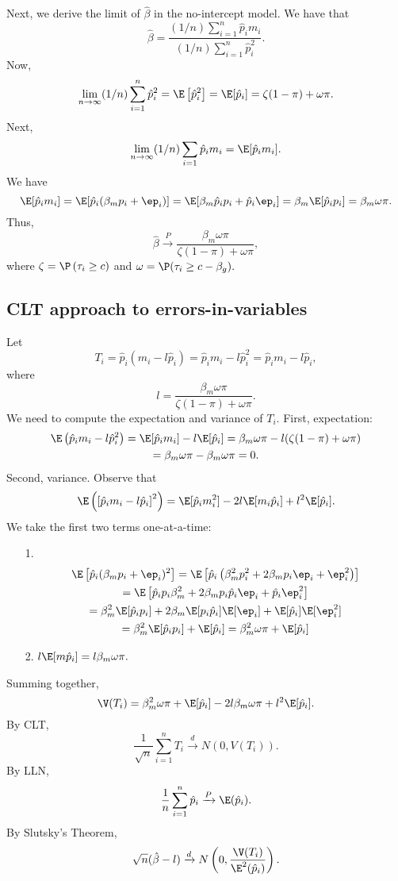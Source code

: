 \documentclass[12pt]{article}
\begin{document}
Next, we derive the limit of $\hat{\beta}$ in the no-intercept model. We have that 
$$\hat{\beta} = \frac{ (1/n) \sum_{i=1}^n \hat{p}_i m_i}{(1/n) \sum_{i=1}^n \hat{p}_i^2}.$$
Now,
$$\lim_{n \to \infty} (1/n) \sum_{i=1}^n \hat{p}_i^2 = \E\left[\hat{p}_i^2\right] = \E [\hat{p}_i] = \zeta (1 - \pi) + \omega \pi.$$
Next,
$$\lim_{n \to \infty} (1/n) \sum_{i=1} \hat{p}_i m_i = \E[\hat{p}_i m_i].$$ We have
$$ \E[\hat{p}_i m_i] = \E[ \hat{p}_i (\beta_m p_i + \ep_i)] = \E[\beta_m \hat{p}_i p_i + \hat{p}_i \ep_i] = \beta_m \E[ \hat{p}_i p_i] = \beta_m \omega \pi.$$ Thus,
$$ \hat{\beta} \xrightarrow{P} \frac{\beta_m \omega \pi}{ \zeta(1-\pi) + \omega \pi},$$ where $\zeta = \P\left(\tau_i \geq c \right)$ and $\omega = \P(\tau_i \geq c - \beta_g).$

\subsection{CLT approach to errors-in-variables}
Let 
$$ T_i = \hat{p}_i (m_i - l \hat{p}_i) = \hat{p}_im_i - l \hat{p}^2_i = \hat{p}_i m_i - l \hat{p}_i,$$ where
$$l = \frac{\beta_m \omega \pi}{\zeta (1 - \pi) + \omega \pi}. $$
We need to compute the expectation and variance of $T_i$. First, expectation:
\begin{multline*}
\E\left( \hat{p}_i m_i - l \hat{p}_i^2 \right) = \E [ \hat{p}_i m_i ] - l \E [\hat{p}_i] = \beta_m \omega \pi - l ( \zeta (1 - \pi) + \omega \pi ) \\ = \beta_m \omega \pi - \beta_m \omega \pi = 0.
\end{multline*}
Second, variance. Observe that
$$ \E \left( \left[ \hat{p}_i m_i - l \hat{p}_i \right]^2 \right) = \E [\hat{p}_i m_i^2] - 2 l \E[m_i \hat{p}_i] + l^2 \E[\hat{p}_i].$$ We take the first two terms one-at-a-time:
\begin{itemize}
\item[1.] \begin{multline*}
\E \left[ \hat{p}_i( \beta_m p_i + \ep_i )^2 \right] = \E\left[ \hat{p}_i \left( \beta_m^2 p_i^2 + 2 \beta_m p_i \ep_i + \ep_i^2 \right)  \right] \\ = \E\left[ \hat{p}_i p_i \beta^2_m + 2 \beta_m p_i \hat{p}_i \ep_i + \hat{p}_i \ep_i^2 \right] \\ = \beta^2_m \E[ \hat{p}_i p_i] + 2 \beta_m \E[p_i\hat{p}_i] \E[\ep_i] + \E[\hat{p}_i] \E[ \ep^2_i ] \\ = \beta^2_m \E[ \hat{p}_i p_i] + \E[\hat{p}_i] = \beta^2_m \omega \pi + \E[ \hat{p}_i ] 
\end{multline*}
\item[2.] $l \E[m \hat{p}_i] = l \beta_m \omega \pi.$
\end{itemize}
Summing together,
$$\V(T_i) = \beta^2_m\omega\pi + \E[\hat{p}_i] - 2 l \beta_m \omega \pi + l^2 \E[\hat{p}_i].$$
By CLT,
$$\frac{1}{\sqrt{n}} \sum_{i=1}^n T_i \xrightarrow{d} N(0, V(T_i)).$$
 By LLN, $$ \frac{1}{n} \sum_{i=1}^n \hat{p}_i \xrightarrow{P} \E(\hat{p}_i).$$
 By Slutsky's Theorem,
 $$\sqrt{n} (\hat{\beta} - l) \xrightarrow{d} N\left(0, \frac{\V(T_i)}{\E^2(\hat{p}_i)}\right).$$
 
 
\end{document}
